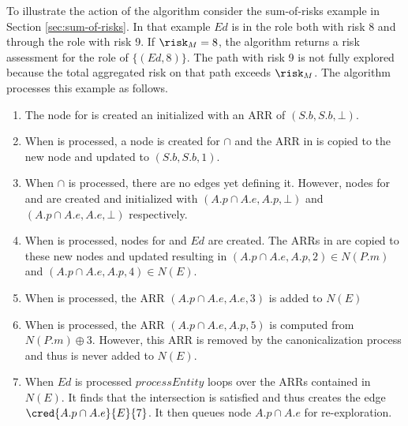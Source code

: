 To illustrate the action of the algorithm consider the sum-of-risks example in Section
\ref{sec:sum-of-risks}. In that example $\mathit{Ed}$ is in the  role both
with risk 8 and through the  role with risk 9. If $\risk_M = 8$, the
algorithm returns a risk assessment for the  role of $\{(\mathit{Ed}, 8)\}$.
The path with risk 9 is not fully explored because the total aggregated risk on that path
exceeds $\risk_M$. The algorithm processes this example as follows.
\begin{enumerate}

\item The node for  is created an initialized with an ARR of $(S.b, S.b,
  \bot)$.

\item When  is processed, a node is created for  $\cap$
   and the ARR in  is copied to the new node and updated
  to $(S.b, S.b, 1)$.

\item When  $\cap$  is processed, there are no edges
  yet defining it. However, nodes for  and  are
  created and initialized with $(A.p \cap A.e, A.p, \bot)$ and $(A.p \cap A.e, A.e, \bot)$
  respectively.

\item When  is processed, nodes for  and
  $\mathit{Ed}$ are created. The ARRs in  are copied to these new nodes
  and updated resulting in $(A.p \cap A.e, A.p, 2) \in N(P.m)$ and $(A.p \cap A.e, A.p, 4) \in
  N(E)$.

\item When  is processed, the ARR $(A.p \cap A.e, A.e, 3)$ is added to
  $N(E)$

\item When  is processed, the ARR $(A.p \cap A.e, A.p, 5)$ is computed
  from $N(P.m) \oplus 3$. However, this ARR is removed by the canonicalization process and thus
  is never added to $N(E)$.

\item When $\mathit{Ed}$ is processed $\mathit{processEntity}$ loops over the ARRs contained in
  $N(E)$. It finds that the intersection is satisfied and thus creates the edge $\cred{A.p \cap
    A.e}{E}{7}$. It then queues node $A.p \cap A.e$ for re-exploration.


\end{enumerate}
